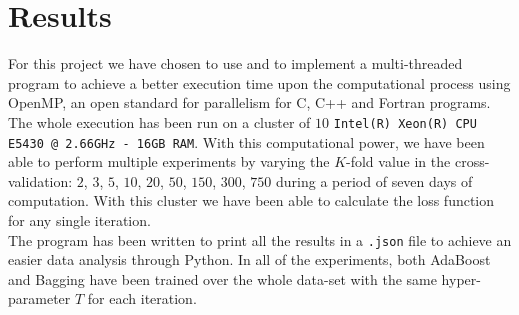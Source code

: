 
\chapter{Results}
For this project we have chosen to use  and to implement a multi-threaded program to achieve a better execution time upon the computational process using OpenMP, an open standard for parallelism for C, C++ and Fortran programs. The whole execution has been run on a cluster of $10$ \texttt{Intel(R) Xeon(R) CPU E5430 @ 2.66GHz - 16GB RAM}. With this computational power, we have been able to perform multiple experiments by varying the $K$-fold value in the cross-validation: $2$, $3$, $5$, $10$, $20$, $50$, $150$, $300$, $750$ during a period of seven days of computation. With this cluster we have been able to calculate the loss function for any single iteration.\\
The program has been written to print all the results in a \texttt{.json} file to achieve an easier data analysis through Python. In all of the experiments, both AdaBoost and Bagging have been trained over the whole data-set with the same hyper-parameter $T$ for each iteration.\\
